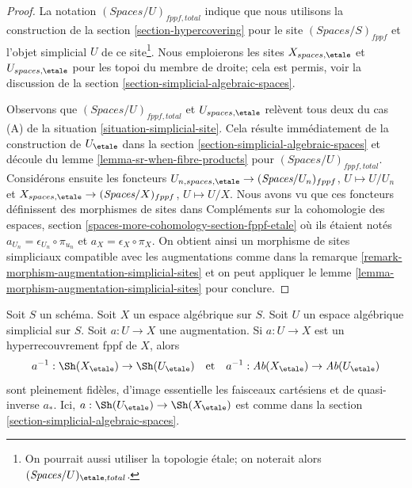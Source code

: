 \begin{proof}
La notation $(\textit{Spaces}/U)_{fppf, total}$ indique que
nous utilisons la construction de
la section \ref{section-hypercovering}
pour le site $(\textit{Spaces}/S)_{fppf}$ et l'objet simplicial
$U$ de ce site\footnote{On pourrait aussi
utiliser la topologie \'etale; on noterait alors
$(\textit{Spaces}/U)_{\etale, total}$.}.
Nous emploierons les sites $X_{spaces, \etale}$ et $U_{spaces, \etale}$
pour les topoi du membre de droite; cela est permis,
voir la discussion de la section \ref{section-simplicial-algebraic-spaces}.

\medskip\noindent
Observons que $(\textit{Spaces}/U)_{fppf, total}$ et
$U_{spaces, \etale}$
relèvent tous deux du cas (A) de la situation \ref{situation-simplicial-site}.
Cela résulte immédiatement de la construction de
$U_\etale$ dans la section \ref{section-simplicial-algebraic-spaces}
et découle du lemme \ref{lemma-sr-when-fibre-products}
pour $(\textit{Spaces}/U)_{fppf, total}$.
Considérons ensuite les foncteurs
$U_{n, spaces, \etale} \to (\textit{Spaces}/U_n)_{fppf}$, $U \mapsto U/U_n$
et
$X_{spaces, \etale} \to (\textit{Spaces}/X)_{fppf}$, $U \mapsto U/X$.
Nous avons vu que ces foncteurs définissent des morphismes de sites dans
Compléments sur la cohomologie des espaces, section
\ref{spaces-more-cohomology-section-fppf-etale}
où ils étaient notés $a_{U_n} = \epsilon_{U_n} \circ \pi_{u_n}$
et $a_X = \epsilon_X \circ \pi_X$.
On obtient ainsi un morphisme de sites simpliciaux compatible avec les augmentations
comme dans la remarque \ref{remark-morphism-augmentation-simplicial-sites}
et on peut appliquer le lemme
\ref{lemma-morphism-augmentation-simplicial-sites} pour conclure.
\end{proof}

\begin{lemma}
\label{lemma-descent-sheaves-for-fppf-hypercovering}
Soit $S$ un schéma. Soit $X$ un espace algébrique sur $S$.
Soit $U$ un espace algébrique simplicial sur $S$. Soit $a : U \to X$
une augmentation. Si $a : U \to X$ est un hyperrecouvrement fppf de $X$,
alors
$$
a^{-1} : \Sh(X_\etale) \to \Sh(U_\etale)
\quad\text{et}\quad
a^{-1} : \textit{Ab}(X_\etale) \to \textit{Ab}(U_\etale)
$$
sont pleinement fidèles, d'image essentielle les faisceaux cartésiens et
de quasi-inverse $a_*$. Ici, $a : \Sh(U_\etale) \to \Sh(X_\etale)$
est comme dans la section \ref{section-simplicial-algebraic-spaces}.
\end{lemma}

